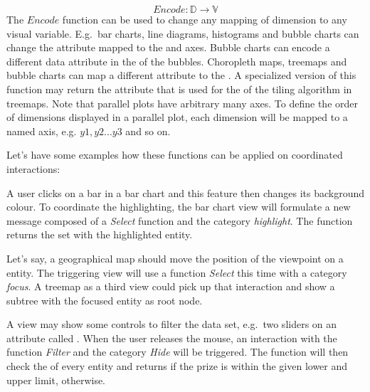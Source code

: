 \begin{equation} Encode: \mathbb{D} \rightarrow \mathbb{V} \end{equation}
  The $Encode$ function can be used to change any mapping of dimension to any visual variable.
  E.g.\ bar charts, line diagrams, histograms and bubble charts can change the attribute mapped to the  and  axes.
  Bubble charts can encode a different data attribute in the  of the bubbles.
  Choropleth maps, treemaps and bubble charts can map a different attribute to the .
  A specialized version of this function may return the attribute that is used for the  of the tiling algorithm in treemaps.
  Note that parallel plots have arbitrary many  axes.
  To define the order of dimensions displayed in a parallel plot, each dimension will be mapped to a named  axis, e.g. $y1, y2 ... y3$ and so on.

Let's have some examples how these functions can be applied on coordinated interactions:

A user clicks on a bar in a bar chart and this feature then changes its background colour.
To coordinate the highlighting, the bar chart view will formulate a new message composed of a \emph{Select} function and the category \emph{highlight}.
The function returns the set with the highlighted entity.

Let's say, a geographical map should move the position of the viewpoint on a entity.
The triggering view will use a function \emph{Select} this time with a category \emph{focus}.
A treemap as a third view could pick up that interaction and show a subtree with the focused entity as root node. 

A view may show some controls to filter the data set, e.g.\ two sliders on an attribute called .
When the user releases the mouse, an interaction with the function \emph{Filter} and the category \emph{Hide} will be triggered.  
The function will then check the  of every entity and returns  if the prize is within the given lower and upper limit,  otherwise.


